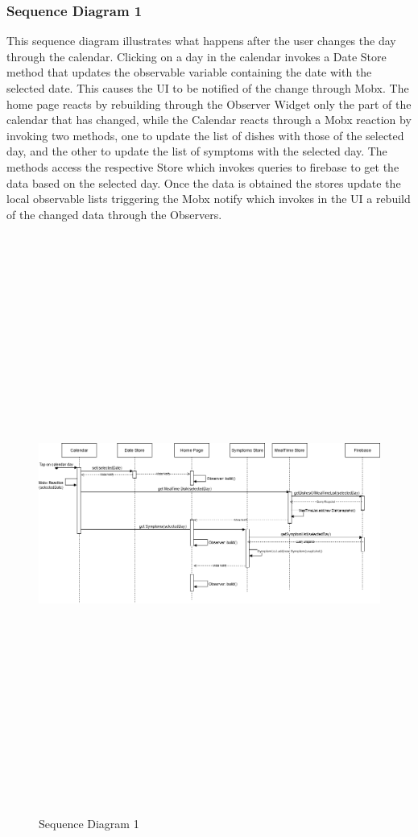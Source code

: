 \documentclass [12pt]{article}
\begin{document}
\subsubsection{Sequence Diagram 1}
This sequence diagram illustrates what happens after the user changes the day through the calendar.
Clicking on a day in the calendar invokes a Date Store method that updates the observable variable containing the date with the selected date. This causes the UI to be notified of the change through Mobx. The home page reacts by rebuilding through the Observer Widget only the part of the calendar that has changed, while the Calendar reacts through a Mobx reaction by invoking two methods, one to update the list of dishes with those of the selected day, and the other to update the list of symptoms with the selected day.
The methods access the respective Store which invokes queries to firebase to get the data based on the selected day. Once the data is obtained the stores update the local observable lists triggering the Mobx notify which invokes in the UI a rebuild of the changed data through the Observers.

\begin{figure}[ht!]
\centering
\includegraphics[height=19cm, width=\linewidth]{SequenceCalendarClick.png}
\caption{Sequence Diagram 1}
\end{figure}  
\clearpage
\end{document}
